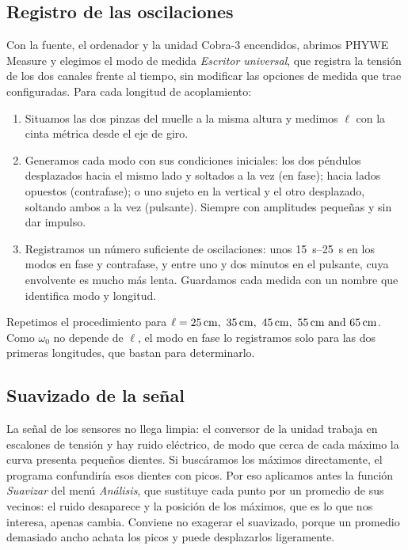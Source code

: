 \documentclass[a4paper,11pt]{amsart}
\numberwithin{equation}{section}
\newcommand{\wz}{\omega_0}                    %
\theoremstyle{cienplano}
\theoremstyle{ciendef}
\theoremstyle{cienobs}
\begin{document}
\subsection{Registro de las oscilaciones}\label{sec:registro}
Con la fuente, el ordenador y la unidad Cobra-3 encendidos, abrimos PHYWE
Measure y elegimos el modo de medida \emph{Escritor universal}, que registra
la tensión de los dos canales frente al tiempo, sin modificar las opciones de
medida que trae configuradas. Para cada longitud de acoplamiento:
\begin{enumerate}
  \item Situamos las dos pinzas del muelle a la misma altura y medimos $\ell$
        con la cinta métrica desde el eje de giro.
  \item Generamos cada modo con sus condiciones iniciales: los dos péndulos
        desplazados hacia el mismo lado y soltados a la vez (en fase); hacia
        lados opuestos (contrafase); o uno sujeto en la vertical y el otro
        desplazado, soltando ambos a la vez (pulsante). Siempre con
        amplitudes pequeñas y sin dar impulso.
  \item Registramos un número suficiente de oscilaciones: unos
        \SIrange{15}{25}{\second} en los modos en fase y contrafase, y entre
        uno y dos minutos en el pulsante, cuya envolvente es mucho más
        lenta. Guardamos cada medida con un nombre que identifica modo y
        longitud.
\end{enumerate}
Repetimos el procedimiento para $\ell=\SIlist{25;35;45;55;65}{\centi\meter}$.
Como $\wz$ no depende de $\ell$, el modo en fase lo registramos solo para las
dos primeras longitudes, que bastan para determinarlo.

\subsection{Suavizado de la señal}\label{sec:suavizado}
La señal de los sensores no llega limpia: el conversor de la unidad trabaja
en escalones de tensión y hay ruido eléctrico, de modo que cerca de cada
máximo la curva presenta pequeños dientes. Si buscáramos los máximos
directamente, el programa confundiría esos dientes con picos. Por eso
aplicamos antes la función \emph{Suavizar} del menú \emph{Análisis}, que
sustituye cada punto por un promedio de sus vecinos: el ruido desaparece y
la posición de los máximos, que es lo que nos interesa, apenas cambia.
Conviene no exagerar el suavizado, porque un promedio demasiado ancho achata
los picos y puede desplazarlos ligeramente.
\end{document}
